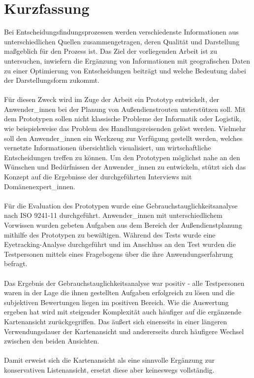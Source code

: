 \documentclass[Bachelorarbeit.tex]{subfiles}
\begin{document}
\chapter*{Kurzfassung}
Bei Entscheidungsfindungsprozessen werden verschiedenste Informationen aus unterschiedlichen Quellen zusammengetragen, deren Qualität und Darstellung maßgeblich für den Prozess ist.
Das Ziel der vorliegenden Arbeit ist zu untersuchen, inwiefern die Ergänzung  von Informationen mit geografischen Daten zu einer Optimierung von Entscheidungen beiträgt und welche Bedeutung dabei der Darstellungsform zukommt.
\\
\\
Für diesen Zweck wird im Zuge der Arbeit ein Prototyp entwickelt, der Anwender\_innen bei der Planung von Außendienstrouten unterstützen soll. 
Mit dem Prototypen sollen nicht klassische Probleme der Informatik oder Logistik, wie beispielsweise das Problem des Handlungsreisenden gelöst werden. Vielmehr soll den Anwender\_innen ein Werkzeug zur Verfügung gestellt werden, welches vernetzte Informationen übersichtlich visualisiert, um wirtschaftliche Entscheidungen treffen zu können.
Um den Prototypen möglichst nahe an den Wünschen und Bedürfnissen der Anwender\_innen zu entwickeln, stützt sich das Konzept auf die Ergebnisse der durchgeführten Interviews mit Domänenexpert\_innen.
\\
\\
Für die Evaluation des Prototypen wurde eine Gebrauchstauglichkeitsanalyse nach ISO 9241-11 durchgeführt. Anwender\_innen mit unterschiedlichem Vorwissen wurden gebeten Aufgaben aus dem Bereich der Außendienstplanung mithilfe des Prototypen zu bewältigen. Während des Tests wurde eine Eyetracking-Analyse durchgeführt und im Anschluss an den Test wurden die Testpersonen mittels eines Fragebogens über die ihre Anwendungserfahrung befragt.
\\
\\
Das Ergebnis der Gebrauchstauglichkeitsanalyse war positiv - alle Testpersonen waren in der Lage die ihnen gestellten Aufgaben erfolgreich zu lösen und die subjektiven Bewertungen liegen im positiven Bereich.
Wie die Auswertung ergeben hat wird mit steigender Komplexität auch häufiger auf die ergänzende Kartenansicht zurückgegriffen. Das äußert sich einerseits in einer längeren Verwendungsdauer der Kartenansicht und andererseits durch häufigere Wechsel zwischen den beiden Ansichten. 
\\
\\
Damit erweist sich die Kartenansicht als eine sinnvolle Ergänzung zur konservativen Listenansicht, ersetzt diese aber keineswegs vollständig.
\end{document}

